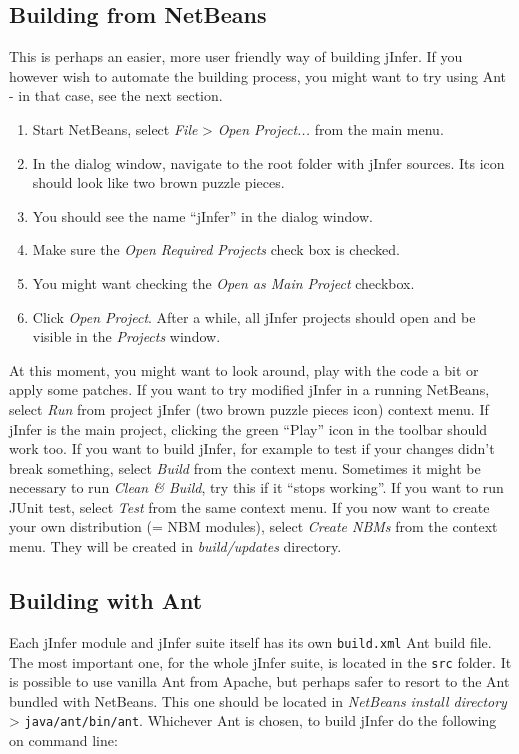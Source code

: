 \documentclass[a4paper,10pt,oneside]{article}
\begin{document}
\subsection*{Building from NetBeans}
\par 
  This is perhaps an easier, more user friendly way of building jInfer.
    If you however wish to automate the building process, you might want to
    try using Ant - in that case, see the next section.

\begin{enumerate}\item 
 Start NetBeans, select \textit{File} > \textit{Open Project...} from the main menu.
  \item In the dialog window, navigate to the root folder with jInfer sources.
    Its icon should look like two brown puzzle pieces.
  \item You should see the name ``jInfer'' in the dialog window.
  \item Make sure the \textit{Open Required Projects} check box is checked.
  \item You might want checking the \textit{Open as Main Project} checkbox.
  \item Click \textit{Open Project}. After a while, all jInfer projects should
    open and be visible in the \textit{Projects} window.
  \end{enumerate}\par At this moment, you might want to look around, play with the
  code a bit or apply some patches. If you want to try modified jInfer in a
  running NetBeans, select \textit{Run} from project jInfer (two brown puzzle
  pieces icon) context menu. If jInfer is the main project, clicking the
  green ``Play'' icon in the toolbar should work too.
  If you want to build jInfer, for example to test if your changes didn't break
  something, select \textit{Build} from the context menu. Sometimes it might be
  necessary to run \textit{Clean \& Build}, try this if it ``stops working''.
  If you want to run JUnit test, select \textit{Test} from the same context menu.
  If you now want to create your own distribution (= NBM modules), select
  \textit{Create NBMs} from the context menu. They will be created in
  \textit{build/updates} directory.
\subsection*{Building with Ant}
\par 
  Each jInfer module and jInfer suite itself has
  its own \texttt{build.xml} Ant build file. The most important one, for the
  whole jInfer suite, is located in the \texttt{src} folder.
  It is possible to use vanilla Ant from Apache, but perhaps safer to resort
  to the Ant bundled with NetBeans. This one should be located in \textit{NetBeans
    install directory} > \texttt{java/ant/bin/ant}.
  Whichever Ant is chosen, to build jInfer do the following on command line:
\end{document}

